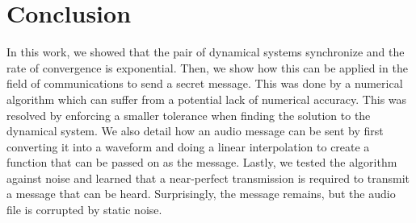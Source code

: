\documentclass[12pt]{article}
\begin{document}
    \section{Conclusion}
    In this work, we showed that the pair of dynamical systems synchronize and the rate of convergence is exponential. Then, we show how this can be applied in the field of communications to send a secret message. This was done by a numerical algorithm which can suffer from a potential lack of numerical accuracy. This was resolved by enforcing a smaller tolerance when finding the solution to the dynamical system. We also detail how an audio message can be sent by first converting it into a waveform and doing a linear interpolation to create a function that can be passed on as the message. Lastly, we tested the algorithm against noise and learned that a near-perfect transmission is required to transmit a message that can be heard. Surprisingly, the message remains, but the audio file is corrupted by static noise. 
  \newpage    
    \printbibliography
\end{document}
